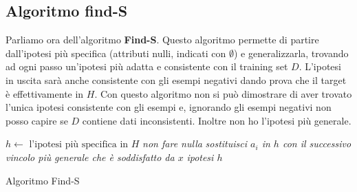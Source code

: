 \subsection{Algoritmo find-S}
Parliamo ora dell'algoritmo \textbf{Find-S}. Questo algoritmo permette di
partire dall'ipotesi più specifica (attributi nulli, indicati con
$\emptyset$) e generalizzarla, 
trovando ad ogni passo un'ipotesi più adatta e consistente con il training
set $D$. L'ipotesi in uscita sarà anche consistente con gli esempi negativi
dando prova che il target è effettivamente in $H$. Con questo algoritmo non si
può dimostrare di aver trovato l'unica ipotesi consistente con gli esempi e,
ignorando gli esempi negativi non posso capire se $D$ contiene dati
inconsistenti. Inoltre non ho l'ipotesi più generale.
\begin{algorithm}[H]
  \begin{algorithmic}
    \State $h\gets \mbox{ l'ipotesi più specifica in } H$
    \State \textit{non fare nulla}
    \Else
    \State \textit{sostituisci $a_i$ in $h$ con il successivo vincolo più}
    \State \textit{generale che è soddisfatto da $x$}
    \EndIf
    \EndFor
    \EndFor
    \Return \textit{ipotesi $h$}
    \EndFunction
  \end{algorithmic}
  \caption{Algoritmo Find-S}
\end{algorithm}
